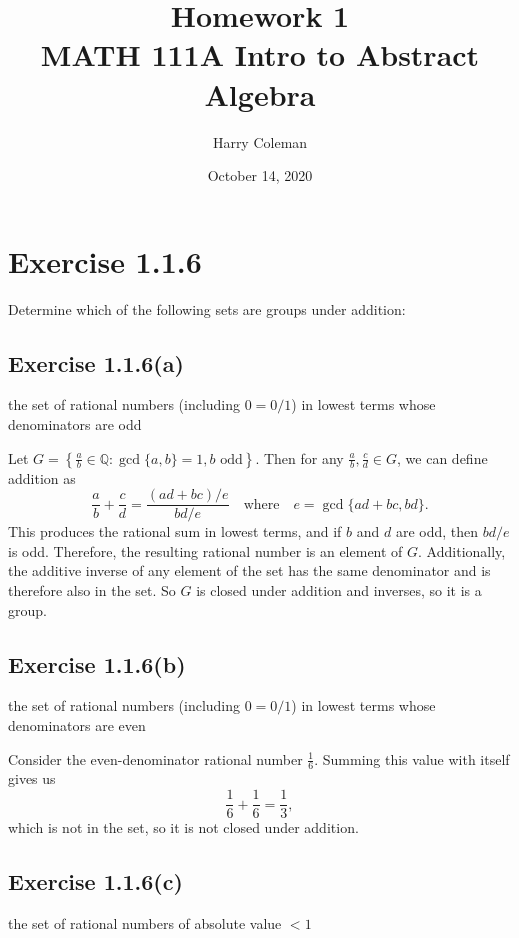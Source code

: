 \documentclass[12pt]{article}
\newenvironment{problem}
    {\begin{lrbox}{\mybox}\begin{minipage}{\textwidth-10pt}}
    {\end{minipage}\end{lrbox}\framebox[6.5in]{\usebox{\mybox}}}
\newcommand{\ds}{\displaystyle}
\newcommand{\isp}[1]{\quad\text{#1}\quad}
\newcommand{\Q}{\mathbb{Q}}
\begin{document}
 
\title{Homework 1\\
    \large MATH 111A Intro to Abstract Algebra
}
\author{Harry Coleman}
\date{October 14, 2020}
\maketitle

\section*{Exercise 1.1.6}
\begin{problem}
    Determine which of the following sets are groups under addition:
\end{problem}

\subsection*{Exercise 1.1.6(a)}
\begin{problem}
    the set of rational numbers (including $0=0/1$) in lowest terms whose denominators are odd
\end{problem}

Let $\ds G=\left\{\frac{a}{b} \in\Q: \gcd\{a,b\}=1, b \text{ odd}\right\}$. Then for any $\ds\frac{a}{b},\frac{c}{d}\in G$, we can define addition as
\[\frac ab + \frac cd = \frac{(ad+bc)/e}{bd/e} \isp{where} e = \gcd\{ad+bc, bd\}.\]
This produces the rational sum in lowest terms, and if $b$ and $d$ are odd, then $bd/e$ is odd. Therefore, the resulting rational number is an element of $G$. Additionally, the additive inverse of any element of the set has the same denominator and is therefore also in the set. So $G$ is closed under addition and inverses, so it is a group.

\subsection*{Exercise 1.1.6(b)}
\begin{problem}
    the set of rational numbers (including $0=0/1$) in lowest terms whose denominators are even
\end{problem}

Consider the even-denominator rational number $\ds\frac16$. Summing this value with itself gives us
\[\frac16 + \frac16 = \frac13,\]
which is not in the set, so it is not closed under addition.

\newpage
\subsection*{Exercise 1.1.6(c)}
\begin{problem}
    the set of rational numbers of absolute value $<1$
\end{problem}
\end{document}

